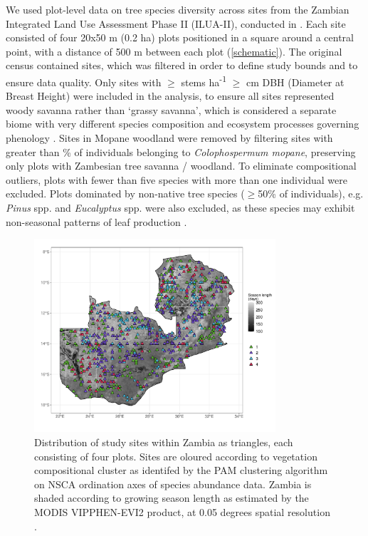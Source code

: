 \documentclass[11pt,a4paper]{article}
\begin{document}
We used plot-level data on tree species diversity across \nSites{} sites from the Zambian Integrated Land Use Assessment Phase II (ILUA-II), conducted in \censusDate{} \citep{Mukosha2009, Pelletier2018}. Each site consisted of four 20x50 m (0.2 ha) plots positioned in a square around a central point, with a distance of 500 m between each plot (\autoref{schematic}). The original census contained \nTotalSites{} sites, which was filtered in order to define study bounds and to ensure data quality. Only sites with $\geq$\stemsHa{} stems ha\textsuperscript{-1} $\geq$\stemSize{} cm DBH (Diameter at Breast Height) were included in the analysis, to ensure all sites represented woody savanna rather than `grassy savanna', which is considered a separate biome with very different species composition and ecosystem processes governing phenology \citep{Parr2014}. Sites in Mopane woodland were removed by filtering sites with greater than \mopanePer{}\% of individuals belonging to \textit{Colophospermum mopane}, preserving only plots with Zambesian tree savanna / woodland. To eliminate compositional outliers, plots with fewer than five species with more than one individual were excluded. Plots dominated by  non-native tree species ($\geq$50\% of individuals), e.g. \textit{Pinus} spp. and \textit{Eucalyptus} spp. were also excluded, as these species may exhibit non-seasonal patterns of leaf production \citep{}.

\begin{figure}[H]
\centering
	\includegraphics[width=0.8\textwidth]{plot_loc}
	\caption{Distribution of study sites within Zambia as triangles, each consisting of four plots. Sites are oloured according to vegetation compositional cluster as identifed by the PAM clustering algorithm on NSCA ordination axes of species abundance data. Zambia is shaded according to growing season length as estimated by the MODIS VIPPHEN-EVI2 product, at 0.05 degrees spatial resolution \citep{VIPPHEN}.}
	\label{plot_loc}
\end{figure}
\end{document}
